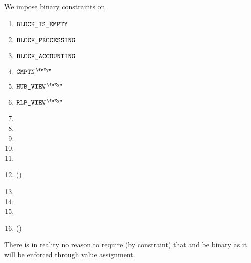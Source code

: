 We impose binary constraints on
\begin{multicols}{2}
	\begin{enumerate}
		\item $\texttt{BLOCK\_IS\_EMPTY}$
		\item $\texttt{BLOCK\_PROCESSING}$
		\item $\texttt{BLOCK\_ACCOUNTING}$
		\item $\isUserTxnComputation$
		\item $\isUserTxnHubView$
		\item $\isUserTxnRlpView$
		\item \txIsLegacy{}
		\item \txIsAccessSet{}
		\item \txIsTypeTwo{}
		\item \txIsDeployment{}
		\item \txStatusCode{}
		\item \txCopyTxcd{} \quad (\trash)
		\item \txRequiresEvmExecution{}
		\item \eucFlag{}
		\item \wcpFlag{}
		\item \isLastTxOfBlock{} \quad (\trash)
	\end{enumerate}
\end{multicols}
\saNote{}
There is in reality no reason to require (by constraint) that \txCopyTxcd{} and \isLastTxOfBlock{} be binary as it will be enforced through value assignment.
